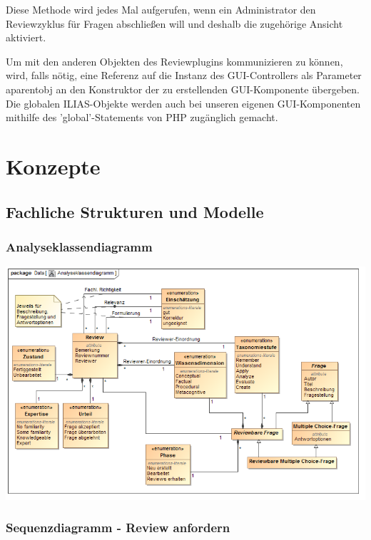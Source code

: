 \documentclass[a4paper]{scrreprt}
\begin{document}
Diese Methode wird jedes Mal aufgerufen, wenn ein Administrator den Reviewzyklus für Fragen abschließen will und deshalb die zugehörige Ansicht aktiviert. 

Um mit den anderen Objekten des Reviewplugins kommunizieren zu können, wird, falls nötig, eine Referenz auf die Instanz des GUI-Controllers als Parameter a\textunderscore parent\textunderscore obj an den Konstruktor der zu erstellenden GUI-Komponente übergeben. 
Die globalen ILIAS-Objekte werden auch bei unseren eigenen GUI-Komponenten mithilfe des 'global'-Statements von PHP zugänglich gemacht.

\chapter{Konzepte}

\section{Fachliche Strukturen und Modelle}

\subsection{Analyseklassendiagramm}

\includegraphics[width=1.0\textwidth]{Class_Diagram__Analyseklassendiagramm.png}
\label{Analyseklassendiagramm}

\newpage

\subsection{Sequenzdiagramm - Review anfordern}
\end{document}
